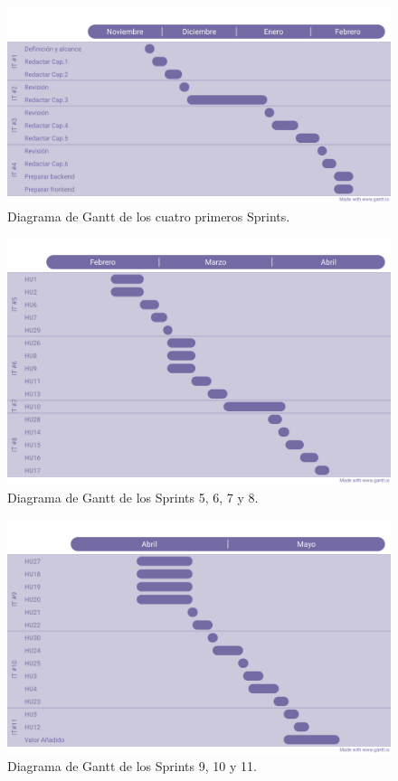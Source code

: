 \begin{figure}[H]
    \centering
    \centerline{\includegraphics[width=1\textwidth]{imagenes/c4/gantt1.png}}
    \caption{Diagrama de Gantt de los cuatro primeros Sprints.}
    \label{fig:diagrama_gantt1}
\end{figure}

\begin{figure}[H]

    \centering
    \centerline{\includegraphics[width=1\textwidth]{imagenes/c4/gantt2.png}}
    \caption{Diagrama de Gantt de los Sprints 5, 6, 7 y 8.}
    \label{fig:diagrama_gantt2}
\end{figure}

\begin{figure}[H]
    \centering
    \centerline{\includegraphics[width=1.1\textwidth]{imagenes/c4/gantt3.png}}
    \caption{Diagrama de Gantt de los Sprints 9, 10 y 11.}
    \label{fig:diagrama_gantt3}
\end{figure}

